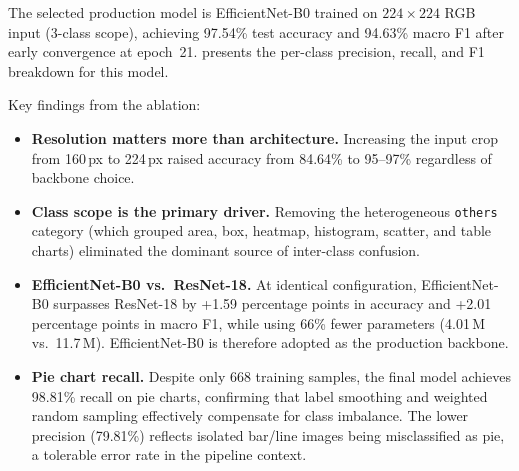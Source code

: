 \begin{table}[htbp]
\centering
\caption{Chart classifier ablation: backbone, resolution, and class scope.}
\label{tab:classifier_ablation}

\end{table}

The selected production model is EfficientNet-B0 trained on $224 \times 224$ RGB
input (3-class scope), achieving 97.54\% test accuracy and 94.63\% macro F1 after
early convergence at epoch~21.  presents the per-class
precision, recall, and F1 breakdown for this model.

\begin{table}[htbp]
\centering
\caption{EfficientNet-B0 3-class per-class evaluation (test set, $n=1{,}952$).}
\label{tab:classifier_final}

\end{table}

Key findings from the ablation:

\begin{itemize}
    \item \textbf{Resolution matters more than architecture.} Increasing the input
    crop from 160\,px to 224\,px raised accuracy from 84.64\% to 95--97\%
    regardless of backbone choice.

    \item \textbf{Class scope is the primary driver.} Removing the heterogeneous
    \texttt{others} category (which grouped area, box, heatmap, histogram, scatter,
    and table charts) eliminated the dominant source of inter-class confusion.

    \item \textbf{EfficientNet-B0 vs.\ ResNet-18.} At identical configuration,
    EfficientNet-B0 surpasses ResNet-18 by +1.59 percentage points in accuracy and
    +2.01 percentage points in macro F1, while using 66\% fewer parameters
    (4.01\,M vs.\ 11.7\,M). EfficientNet-B0 is therefore adopted as the production
    backbone.

    \item \textbf{Pie chart recall.} Despite only 668 training samples, the final
    model achieves 98.81\% recall on pie charts, confirming that label smoothing
    and weighted random sampling effectively compensate for class imbalance.
    The lower precision (79.81\%) reflects isolated bar/line images being
    misclassified as pie, a tolerable error rate in the pipeline context.
\end{itemize}

